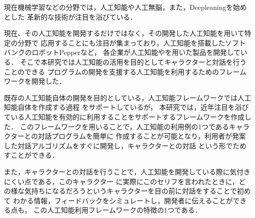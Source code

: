 %
現在機械学習などの分野では，人工知能や人工無脳，また，Deepleaningを始めとした
革新的な技術が注目を浴びている．

現在、その人工知能を開発するだけではなく，その開発した人工知能を用いて特定の分野で
応用することにも注目が集まっており，人工知能を搭載したソフトバンクのロボットPepperなど，
各企業が人工知能やを用いた製品を開発している．
そこで本研究では人工知能の活用を目的としてキャラクターと対話を行うことのできる
プログラムの開発を支援する人工知能を利用するためのフレームワークを開発した．

既存の人工知能自体の開発を目的としている，人工知能フレームワークでは人工知能自体を作成する過程
をサポートしているが，
本研究では，近年注目を浴びている人工知能を有効的に利用することをサポートするフレームワークを作成した．
このフレームワークを用いることで，人工知能の利用例の1つであるキャラクターとの対話プログラムを簡単に
作成することが可能となり，利用者が発案した対話アルゴリズムをすぐに開発し，キャラクターとの対話
という形でためすことができる．

また，キャラクターとの対話を行うことで，人工知能を開発している際に気付きにくい点である，このキャラクター
に実際にこのセリフを言われたときに，どの様な気持ちになるだろうというキャラクターを目の前に対話をすることで初めて
わかる情報，フィードバックをシミュレートし，開発者に伝えることができる点も，
この人工知能利用フレームワークの特徴の1つである．